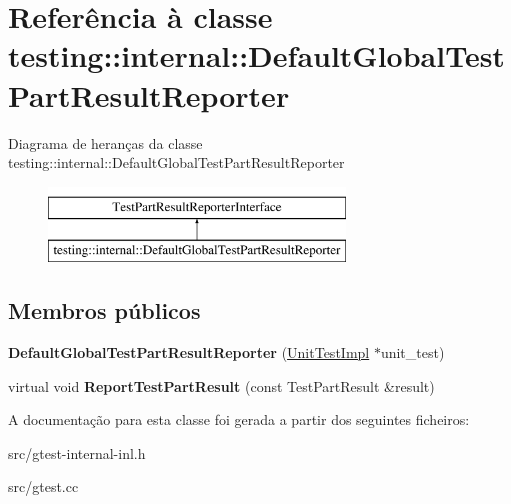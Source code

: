 \hypertarget{classtesting_1_1internal_1_1DefaultGlobalTestPartResultReporter}{\section{Referência à classe testing\-:\-:internal\-:\-:Default\-Global\-Test\-Part\-Result\-Reporter}
\label{classtesting_1_1internal_1_1DefaultGlobalTestPartResultReporter}
}
Diagrama de heranças da classe testing\-:\-:internal\-:\-:Default\-Global\-Test\-Part\-Result\-Reporter\begin{figure}[H]
\begin{center}
\leavevmode
\includegraphics[height=2.000000cm]{classtesting_1_1internal_1_1DefaultGlobalTestPartResultReporter}
\end{center}
\end{figure}
\subsection*{Membros públicos}
\begin{DoxyCompactItemize}
\item 
\hypertarget{classtesting_1_1internal_1_1DefaultGlobalTestPartResultReporter_a3900ea7f34b34afd48c7d1d0312a1488}{{\bfseries Default\-Global\-Test\-Part\-Result\-Reporter} (\hyperlink{classtesting_1_1internal_1_1UnitTestImpl}{Unit\-Test\-Impl} $\ast$unit\-\_\-test)}\label{classtesting_1_1internal_1_1DefaultGlobalTestPartResultReporter_a3900ea7f34b34afd48c7d1d0312a1488}

\item 
\hypertarget{classtesting_1_1internal_1_1DefaultGlobalTestPartResultReporter_a6081576a23b964cfecab1e424d8044fc}{virtual void {\bfseries Report\-Test\-Part\-Result} (const Test\-Part\-Result \&result)}\label{classtesting_1_1internal_1_1DefaultGlobalTestPartResultReporter_a6081576a23b964cfecab1e424d8044fc}

\end{DoxyCompactItemize}


A documentação para esta classe foi gerada a partir dos seguintes ficheiros\-:\begin{DoxyCompactItemize}
\item 
src/gtest-\/internal-\/inl.\-h\item 
src/gtest.\-cc\end{DoxyCompactItemize}
